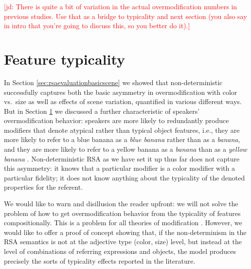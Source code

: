 \documentclass[11pt]{article}
\newcommand{\jd}[1]{\textcolor{Red}{[jd: #1]}}
\newcommand{\sectionref}[1]{Section \ref{#1}}
\begin{document}
\jd{There is quite a bit of variation in the actual overmodification numbers in previous studies. Use that as a bridge to typicality and next section (you also say in intro that you're going to discuss this, so you better do it).} 



\section{Feature typicality}
\label{sec:colortypicality}

In \sectionref{sec:rsaevaluationbasicscene} we showed that non-deterministic successfully captures both the basic asymmetry in overmodification with color vs.~size as well as effects of scene variation, quantified in various different ways. But in \sectionref{sec:colortypicality} we discussed a further characteristic of speakers' overmodification behavior: speakers are more likely to redundantly produce modifiers that denote atypical rather than typical object features, i.e., they are more likely to refer to a blue banana as a \emph{blue banana} rather than as a \emph{banana}, and they are more likely to refer to a yellow banana as a \emph{banana} than as a \emph{yellow banana} \cite{sedivy2003a, Westerbeek2015}. Non-deterministic RSA as we have set it up thus far does not capture this asymmetry: it knows that a particular modifier is a color modifier with a particular fidelity; it does not know anything about the typicality of the denoted properties for the referent. 

We would like to warn and disillusion the reader upfront: we will not solve the problem of how to get overmodification behavior from the typicality of features compositionally. This is a problem for all theories of modification \cite{kamp1995}. However, we would like to offer a proof of concept showing that, if the non-determinism in the RSA semantics is not at the adjective type (color, size) level, but instead at the level of combinations of referring expressions and objects, the model produces precisely the sorts of typicality effects reported in the literature. 
\end{document}
